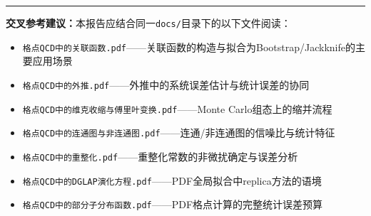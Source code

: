 \documentclass[12pt,a4paper]{ctexart}
\theoremstyle{definition}
\begin{document}
\vspace{0.5cm}
\noindent\rule{\textwidth}{0.5pt}
\small
\textbf{交叉参考建议：}本报告应结合同一\texttt{docs/}目录下的以下文件阅读：
\begin{itemize}[nosep]
    \item \texttt{格点QCD中的关联函数.pdf}——关联函数的构造与拟合为Bootstrap/Jackknife的主要应用场景
    \item \texttt{格点QCD中的外推.pdf}——外推中的系统误差估计与统计误差的协同
    \item \texttt{格点QCD中的维克收缩与傅里叶变换.pdf}——Monte Carlo组态上的缩并流程
    \item \texttt{格点QCD中的连通图与非连通图.pdf}——连通/非连通图的信噪比与统计特征
    \item \texttt{格点QCD中的重整化.pdf}——重整化常数的非微扰确定与误差分析
    \item \texttt{格点QCD中的DGLAP演化方程.pdf}——PDF全局拟合中replica方法的语境
    \item \texttt{格点QCD中的部分子分布函数.pdf}——PDF格点计算的完整统计误差预算
\end{itemize}
\end{document}
